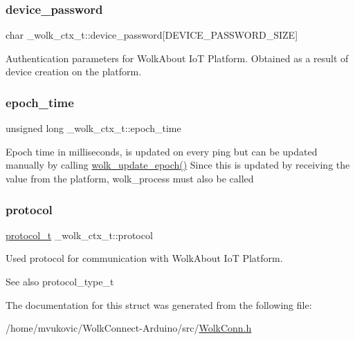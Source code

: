 \subsubsection{\texorpdfstring{device\+\_\+password}{device\_password}}
{\footnotesize\ttfamily char \+\_\+wolk\+\_\+ctx\+\_\+t\+::device\+\_\+password\mbox{[}D\+E\+V\+I\+C\+E\+\_\+\+P\+A\+S\+S\+W\+O\+R\+D\+\_\+\+S\+I\+ZE\mbox{]}}

Authentication parameters for Wolk\+About IoT Platform. Obtained as a result of device creation on the platform. \mbox{\label{struct__wolk__ctx__t_a0c63c52881404b0305e8b4dba0b0b6a6}} 
\subsubsection{\texorpdfstring{epoch\+\_\+time}{epoch\_time}}
{\footnotesize\ttfamily unsigned long \+\_\+wolk\+\_\+ctx\+\_\+t\+::epoch\+\_\+time}

Epoch time in milliseconds, is updated on every ping but can be updated manually by calling \hyperlink{WolkConn_8h_afb2e5b566c8535cf38a7038909a36b6e}{wolk\+\_\+update\+\_\+epoch()} Since this is updated by receiving the value from the platform, wolk\+\_\+process must also be called \mbox{\label{struct__wolk__ctx__t_ab98629a506ce39393254cf331189dc9a}} 
\subsubsection{\texorpdfstring{protocol}{protocol}}
{\footnotesize\ttfamily \hyperlink{WolkConn_8h_a91e19fa4fff461493e1a41f7c7aa4e5f}{protocol\+\_\+t} \+\_\+wolk\+\_\+ctx\+\_\+t\+::protocol}

Used protocol for communication with Wolk\+About IoT Platform. \begin{DoxySeeAlso}{See also}
protocol\+\_\+type\+\_\+t 
\end{DoxySeeAlso}


The documentation for this struct was generated from the following file\+:\begin{DoxyCompactItemize}
\item 
/home/mvukovic/\+Wolk\+Connect-\/\+Arduino/src/\hyperlink{WolkConn_8h}{Wolk\+Conn.\+h}\end{DoxyCompactItemize}
